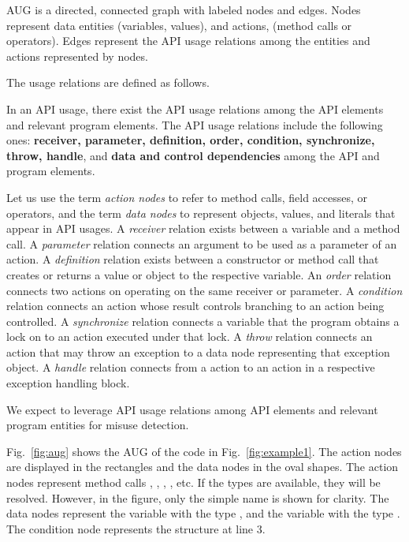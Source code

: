 \begin{Definition}
AUG is a directed, connected graph with labeled nodes and
edges. Nodes represent data entities (variables, values), and actions,
(method calls or operators). Edges represent the API usage
relations among the entities and actions represented by nodes.
\end{Definition}

The usage relations are defined as follows.

\begin{Definition}
  In an API usage, there exist the API usage relations among the API
  elements and relevant program elements. The API usage relations
  include the following ones: {\bf receiver, parameter, definition,
    order, condition, synchronize, throw, handle}, and {\bf data and
    control dependencies} among the API and program elements.
\end{Definition}

Let us use the term {\em action nodes} to refer to method calls, field
accesses, or operators, and the term {\em data nodes} to represent
objects, values, and literals that appear in API usages. A {\em
  receiver} relation exists between a variable and a method call. A
{\em parameter} relation connects an argument to be used as a
parameter of an action. A {\em definition} relation exists between a
constructor or method call that creates or returns a value or object
to the respective variable. An {\em order} relation connects two
actions on operating on the same receiver or parameter. A {\em
  condition} relation connects an action whose result controls
branching to an action being controlled. A {\em synchronize} relation
connects a variable that the program obtains a lock on to an action
executed under that lock. A {\em throw} relation connects an action
that may throw an exception to a data node representing that exception
object. A {\em handle} relation connects from a  action to
an action in a respective exception handling block.

We expect to leverage API usage relations among API elements
and relevant program entities for misuse detection.



Fig.~\ref{fig:aug} shows the AUG of the code in
Fig.~\ref{fig:example1}.  The action nodes are displayed in the
rectangles and the data nodes in the oval shapes. The action nodes
represent method calls ,
, ,
, etc. If the types are available,
they will be resolved. However, in the figure, only the simple name is
shown for clarity. The data nodes represent the variable 
with the type , and the variable 
with the type . The condition node 
represents the  structure at line 3.



